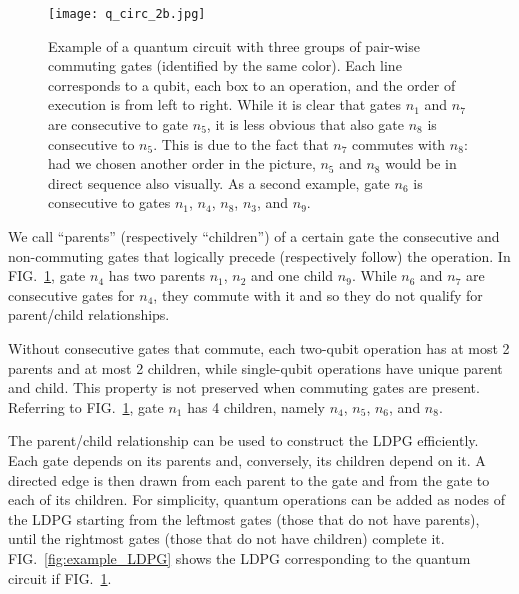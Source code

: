 \documentclass[%
onecolumn,pra,
superscriptaddress,
nofootinbib,
 amsmath,amssymb,
 aps,
11pt,
]{revtex4-1}
\begin{document}
\begin{figure}[b!]
\centering
\texttt{[image: q\_circ\_2b.jpg]}
\caption{Example of a quantum circuit with three groups of pair-wise commuting gates (identified by the same color). Each line corresponds to a qubit, each box to an operation, and the order of execution is from left to right.
While it is clear that gates $n_1$ and $n_7$ are consecutive to gate $n_5$, it is less obvious that also gate $n_8$ is consecutive to $n_5$. This is due to the fact that $n_7$ commutes with $n_8$: had we chosen another order in the picture, $n_5$ and $n_8$ would be in direct sequence also visually. As a second example, gate $n_6$ is consecutive to gates $n_1$, $n_4$, $n_8$, $n_3$, and $n_9$.}\label{fig:consecutive_gates}
\end{figure}

We call ``parents'' (respectively ``children'') of a certain gate the consecutive and non-commuting gates that logically precede (respectively follow) the operation. In FIG.~\ref{fig:consecutive_gates}, gate $n_4$ has two parents $n_1$, $n_2$ and one child $n_9$. While $n_6$ and $n_7$ are consecutive gates for $n_4$, they commute with it and so they do not qualify for parent/child relationships.

Without consecutive gates that commute, each two-qubit operation has at most 2 parents and at most 2 children, while single-qubit operations have unique parent and child. This property is not preserved when commuting gates are present. Referring to FIG.~\ref{fig:consecutive_gates}, gate $n_1$ has 4 children, namely $n_4$, $n_5$, $n_6$, and $n_8$.

The parent/child relationship can be used to construct the LDPG efficiently. Each gate depends on its parents and, conversely, its children depend on it. A directed edge is then drawn from each parent to the gate and from the gate to each of its children. For simplicity, quantum operations can be added as nodes of the LDPG starting from the leftmost gates (those that do not have parents), until the rightmost gates (those that do not have children) complete it. FIG.~\ref{fig:example_LDPG} shows the LDPG corresponding to the quantum circuit if FIG.~\ref{fig:consecutive_gates}.
\end{document}
